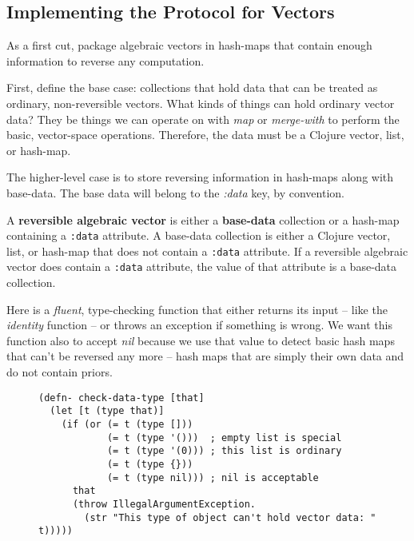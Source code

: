 \documentclass[11pt]{article}
\begin{document}
\subsection{Implementing the Protocol for Vectors}
\label{sec-2-1}

As a first cut, package algebraic vectors in hash-maps that contain
enough information to reverse any computation.

First, define the base case: collections that hold data that can be
treated as ordinary, non-reversible vectors.  What kinds of things can
hold ordinary vector data?  They be things we can operate on with \emph{map}
or \emph{merge-with} to perform the basic, vector-space operations.
Therefore, the data must be a Clojure vector, list, or hash-map.

The higher-level case is to store reversing information in hash-maps
along with base-data. The base data will belong to the \emph{:data} key, by
convention.

\begin{mydefinition}
A \textbf{reversible algebraic vector} is either a \textbf{base-data} collection
or a hash-map containing a \texttt{:data} attribute. A base-data
collection is either a Clojure vector, list, or hash-map that does
not contain a \texttt{:data} attribute. If a reversible algebraic vector
does contain a \texttt{:data} attribute, the value of that attribute
is a base-data collection.
\end{mydefinition}

Here is a \emph{fluent}, type-checking function that either returns its input
-- like the \emph{identity} function -- or throws an exception if something
is wrong.  We want this function also to accept \emph{nil} because we use
that value to detect basic hash maps that can't be reversed any more --
hash maps that are simply their own data and do not contain priors.

\begin{figure}[H]
\label{check-data}
\begin{verbatim}
(defn- check-data-type [that]
  (let [t (type that)]
    (if (or (= t (type []))
            (= t (type '()))  ; empty list is special
            (= t (type '(0))) ; this list is ordinary
            (= t (type {}))
            (= t (type nil))) ; nil is acceptable
      that
      (throw IllegalArgumentException.
        (str "This type of object can't hold vector data: " t)))))
\end{verbatim}
\end{figure}
\end{document}
